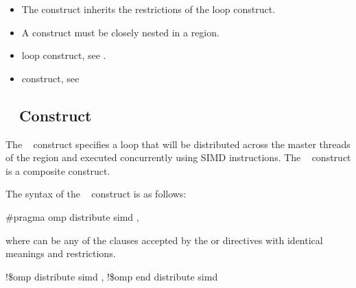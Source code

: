 \begin{itemize}
\item The  construct inherits the restrictions of the loop construct.

\item A  construct must be closely nested in a  region. 
\end{itemize}

\crossreferences
\begin{itemize}
\item loop construct, see 
.

\item {} construct, see 
\end{itemize}










\subsection{~ Construct}
\label{subsec:distribute simd Construct}
\summary
The ~ construct specifies a loop that will be distributed across the 
master threads of the  region and executed concurrently using SIMD instructions. The ~ construct is a composite construct.

\syntax
The syntax of the ~ construct is as follows:

\ccppspecificstart
\begin{boxedcode}
\#pragma omp distribute simd \plc{[clause[ [},\plc{] clause] ... ]}
\end{boxedcode}

where  can be any of the clauses accepted by the  or  
directives with identical meanings and restrictions.
\ccppspecificend

\fortranspecificstart
\begin{boxedcode}
!\$omp distribute simd \plc{[clause[ [},\plc{] clause] ... ]}
\plc{[}!\$omp end distribute simd\plc{]}
\end{boxedcode}

